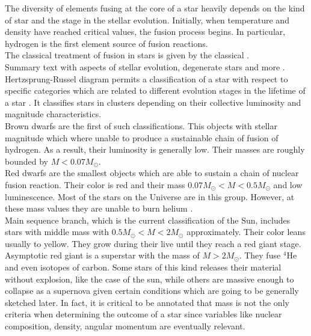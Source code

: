 \documentclass[openany]{book}
\begin{document}
The diversity of elements fusing at the core of a star heavily depends on the kind of star and the stage in the stellar evolution.  Initially, when temperature and density have reached critical values, the fusion process begins. In particular, hydrogen is the first element source of fusion reactions. \\

The classical treatment of fusion in stars is given by the classical \cite{burbidge_burbidge_fowler_hoyle_1957}. \\

Summary text with aspects of stellar evolution, degenerate stars and more \cite{kundt_2005}. \\

Hertzsprung-Russel diagram permits a classification of a star with respect to specific categories which are related to different evolution stages in the lifetime of a star \cite{arsentieva_shevchenko_2021}. It classifies stars in clusters depending on their collective luminosity and magnitude characteristics. \\

Brown dwarfs are the first of such classifications. This objects with stellar magnitude which where unable to produce a sustainable chain of fusion of hydrogen. As a result, their luminosity is generally low. Their masses are roughly bounded by $M < 0.07M_{\odot}$. \\

Red dwarfs are the smallest objects which are able to sustain a chain of nuclear fusion reaction. Their color is red and their mass $ 0.07M_{\odot} < M < 0.5 M_{\odot} $ and low luminescence. Most of the stars on the Universe are in this group. However, at these mass values they are unable to burn helium \cite{kundt_2005}. \\

Main sequence branch, which is the current classification of the Sun, includes stars with middle mass with $ 0.5M_{\odot} < M < 2M_{\odot}$ approximately. Their color leans usually to yellow. They grow during their live until they reach a red giant stage. \\

Asymptotic red giant is a superstar with the mass of $M > 2M_{\odot}$. They fuse $\mathrm{{}^{4}He}$ and even isotopes of carbon. Some stars of this kind releases their material without explosion, like the case of the sun, while others are massive enough to collapse as a supernova given certain conditions which are going to be generally sketched later. In fact, it is critical to be annotated that mass is not the only criteria when determining the outcome of a star since variables like nuclear composition, density, angular momentum are eventually relevant.  \\
\end{document}
